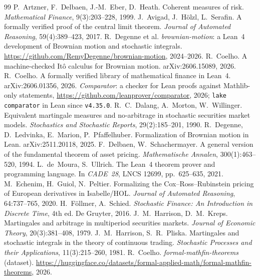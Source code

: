 \documentclass[11pt]{article}
\begin{document}
\begin{thebibliography}{99}
\small
{} P.~Artzner, F.~Delbaen, J.-M.~Eber, D.~Heath. Coherent measures of risk.
  \emph{Mathematical Finance}, 9(3):203--228, 1999.
 J.~Avigad, J.~H\"olzl, L.~Serafin. A formally verified proof of the
  central limit theorem. \emph{Journal of Automated Reasoning}, 59(4):389--423, 2017.
 R.~Degenne et al. \emph{brownian-motion}: a Lean~4 development of Brownian
  motion and stochastic integrals. \url{https://github.com/RemyDegenne/brownian-motion}, 2024--2026.
 R.~Coelho. A machine-checked It\^o calculus for Brownian motion.
  arXiv:2606.15089, 2026.
 R.~Coelho. A formally verified library of mathematical finance in Lean~4.
  arXiv:2606.01356, 2026.
 \emph{Comparator}: a checker for Lean proofs against Mathlib-only statements,
  \url{https://github.com/leanprover/comparator}, 2026; \texttt{lake comparator} in Lean since \texttt{v4.35.0}.
 R.~C.~Dalang, A.~Morton, W.~Willinger. Equivalent martingale measures and no-arbitrage
  in stochastic securities market models. \emph{Stochastics and Stochastic Reports}, 29(2):185--201,
  1990.
 R.~Degenne, D.~Ledvinka, E.~Marion, P.~Pfaffelhuber. Formalization of Brownian
  motion in Lean. arXiv:2511.20118, 2025.
 F.~Delbaen, W.~Schachermayer. A general version of the fundamental
  theorem of asset pricing. \emph{Mathematische Annalen}, 300(1):463--520, 1994.
 L.~de~Moura, S.~Ullrich. The Lean~4 theorem prover and programming
  language. In \emph{CADE~28}, LNCS 12699, pp.~625--635, 2021.
 M.~Echenim, H.~Guiol, N.~Peltier. Formalizing the Cox--Ross--Rubinstein
  pricing of European derivatives in Isabelle/HOL. \emph{Journal of Automated Reasoning}, 64:737--765,
  2020.
 H.~F\"ollmer, A.~Schied. \emph{Stochastic Finance: An Introduction in
  Discrete Time}, 4th ed. De Gruyter, 2016.
 J.~M.~Harrison, D.~M.~Kreps. Martingales and arbitrage in multiperiod
  securities markets. \emph{Journal of Economic Theory}, 20(3):381--408, 1979.
 J.~M.~Harrison, S.~R.~Pliska. Martingales and stochastic integrals in the
  theory of continuous trading. \emph{Stochastic Processes and their Applications}, 11(3):215--260,
  1981.
 R.~Coelho. \emph{formal-mathfin-theorems} (dataset).
  \url{https://huggingface.co/datasets/formal-applied-math/formal-mathfin-theorems}, 2026.

\end{thebibliography}
\end{document}

